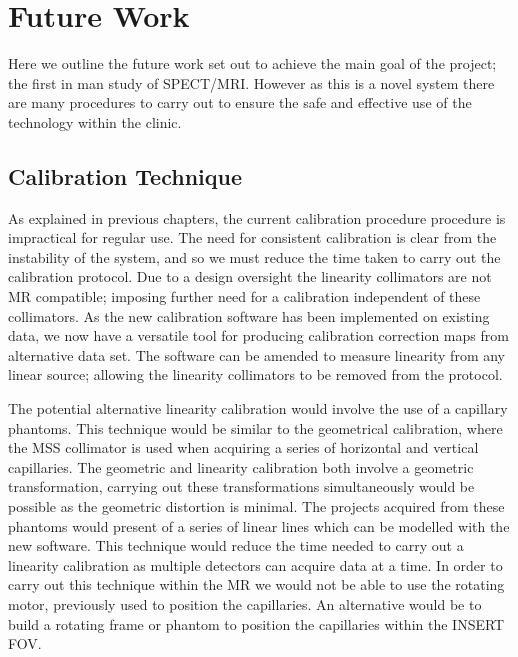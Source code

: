 \chapter{Future Work}
\label{Future}



Here we outline the future work set out to achieve the main goal of the project; the first in man study of \acrshort{SPECT/MRI}. However as this is a novel system there are many procedures to carry out to ensure the safe and effective use of the technology within the clinic.
\section{Calibration Technique}
As explained in previous chapters, the current calibration procedure procedure is impractical for regular use. The need for consistent calibration is clear from the instability of the system, and so we must reduce the time taken to carry out the calibration protocol. Due to a design oversight the linearity collimators are not \acrshort{MR} compatible; imposing further need for a calibration independent of these collimators. As the new calibration software has been implemented on existing data, we now have a versatile tool for producing calibration correction maps from alternative data set. The software can be amended to measure linearity from any linear source; allowing the linearity collimators to be removed from the protocol. 

The potential alternative linearity calibration would involve the use of a capillary phantoms. This technique would be similar to the geometrical calibration, where the \acrshort{MSS} collimator is used when acquiring a series of horizontal and vertical capillaries. The geometric and linearity calibration both involve a geometric transformation, carrying out these transformations simultaneously would be possible as the geometric distortion is minimal. The projects acquired from these phantoms would present of a series of linear lines which can be modelled with the new software. This technique would reduce the time needed to carry out a linearity calibration as multiple detectors can acquire data at a time. In order to carry out this technique within the \acrshort{MR} we would not be able to use the rotating motor, previously used to position the capillaries. An alternative would be to build a rotating frame or phantom to position the capillaries within the \acrshort{INSERT} \acrshort{FOV}.


